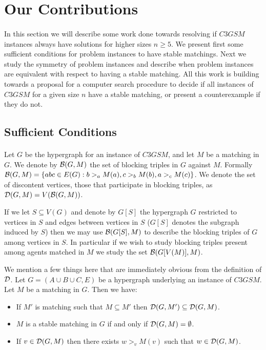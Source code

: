 \section{Our Contributions}
\paragraph{}
In this section we will describe some work done towards resolving if $C3GSM$ instances always have solutions for higher sizes $n\geq 5$. We present first some sufficient conditions for problem instances to have stable matchings. Next we study the symmetry of problem instances and describe when problem instances are equivalent with respect to having a stable matching. All this work is building towards a proposal for a computer search procedure to decide if all instances of $C3GSM$ for a given size $n$ have a stable matching, or present a counterexample if they do not.
\subsection{Sufficient Conditions}\label{subsec:sufficient}
\paragraph{}Let $G$ be the hypergraph for an instance of $C3GSM$, and let $M$ be a matching in $G$. We denote by $\mathcal{B}(G,M)$ the set of blocking triples in $G$ against $M$. Formally $\mathcal{B}(G,M) = \{abc \in E(G): b>_a M(a), c>_b M(b), a>_c M(c)\}$. We denote the set of discontent vertices, those that participate in blocking triples, as $\mathcal{D}(G,M) = V(\mathcal{B}(G,M))$.

\begin{note}
If we let $S \subseteq V(G)$ and denote by $G[S]$ the hypergraph $G$ restricted to vertices in $S$ and edges between vertices in $S$ ($G[S]$ denotes the subgraph induced by $S$) then we may use $\mathcal{B}(G[S],M)$ to describe the blocking triples of $G$ among vertices in $S$. In particular if we wish to study blocking triples present among agents matched in $M$ we study the set $\mathcal{B}(G[V(M)], M)$.
\end{note}
\begin{note}
We mention a few things here that are immediately obvious from the definition of $\mathcal{D}$. Let $G=(A\cup B \cup C, E)$ be a hypergraph underlying an instance of $C3GSM$. Let $M$ be a matching in $G$. Then we have:
\begin{itemize}
\item If $M'$ is matching such that $M \subseteq M'$ then $\mathcal{D}(G,M') \subseteq \mathcal{D}(G,M)$.
\item $M$ is a stable matching in $G$ if and only if $\mathcal{D}(G, M) = \emptyset$.
\item If $v \in \mathcal{D}(G,M)$ then there exists $w >_v M(v)$ such that $w \in \mathcal{D}(G,M)$.
\end{itemize}
\end{note}
